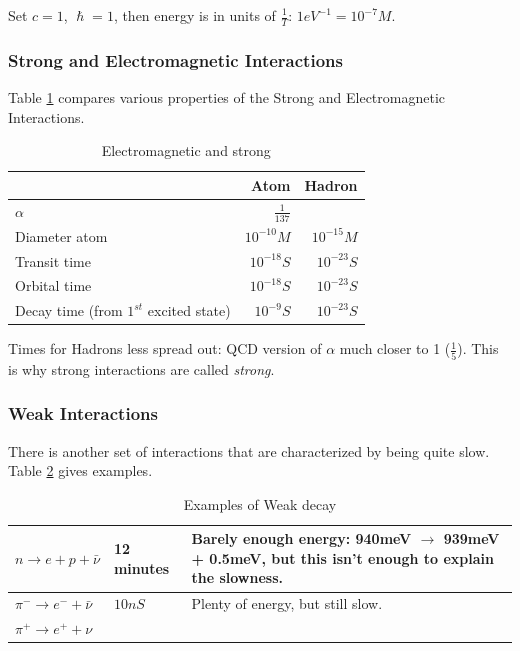 \documentclass[]{article}
\begin{document}
Set $c=1$, $\hslash=1$, then energy is in units of $\frac{1}{T}$: $1eV^{-1}=10^{-7}M$.

\subsubsection{Strong and Electromagnetic Interactions}

Table \ref{table:ems} compares various properties of the Strong and Electromagnetic Interactions.

\begin{table}[H]
	\begin{center}
		\caption{Electromagnetic and strong}\label{table:ems}
		\begin{tabular}{|l|r|r|} \hline
			&Atom&Hadron \\ \hline
			$\alpha$&$\frac{1}{137}$&\\ \hline	
			Diameter atom&$10^{-10}M$&$10^{-15}M$ \\ \hline
			Transit time &$10^{-18}S$&$10^{-23}S$\\ \hline
			Orbital time &$10^{-18}S$&$10^{-23}S$\\ \hline
			Decay time (from $1^{st}$ excited state)&$10^{-9}S$&$10^{-23}S$\\ \hline
		\end{tabular}
	\end{center}
\end{table}

Times for Hadrons less spread out: QCD version of $\alpha$ much closer to 1 ($\frac{1}{5}$). This is why strong interactions are called \emph{strong}.

\subsubsection{Weak Interactions}

There is another set of interactions that are characterized by being quite slow. Table \ref{table:ex:weak} gives examples.

\begin{table}[H]
	\begin{center}
		\caption{Examples of Weak decay}\label{table:ex:weak}
		\begin{tabular}{|l|l|p{6cm}|}\hline
			$n \rightarrow e + p +\bar{\nu}$&12 minutes&Barely enough energy: 940meV $\rightarrow$ 939meV + 0.5meV, but this isn't enough to explain the slowness.\\ \hline
			$\pi^- \rightarrow e^- + \bar{\nu} $&$10nS$&Plenty of energy, but still slow.\\ \hline
			$\pi^+ \rightarrow e^+ + \nu $&&\\ \hline
		\end{tabular}
	\end{center}
\end{table}
\end{document}
